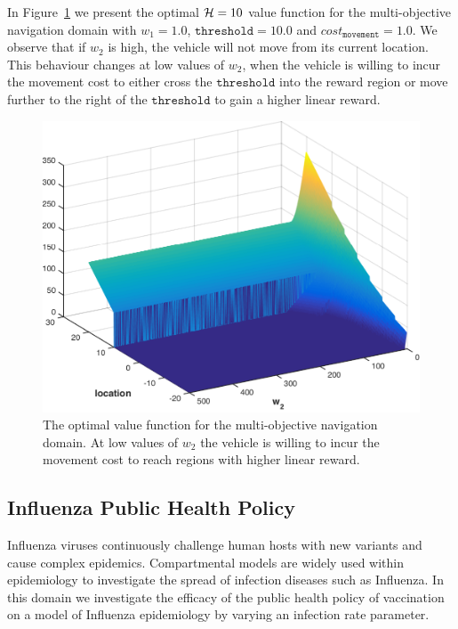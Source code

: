 In Figure~\ref{fig:vehicle1d} we present the optimal {\footnotesize$ \mathcal{H} = 10 $} value function for the multi-objective navigation domain with {\footnotesize $w_1 = 1.0$}, {\footnotesize $ \mathtt{threshold} = 10.0 $} and {\footnotesize$ cost_{\mathtt{movement}} = 1.0 $}. We observe that if {\footnotesize $ w_2 $} is high, the vehicle will not move from its current location. This behaviour changes at low values of {\footnotesize $ w_2 $}, when the vehicle is willing to incur the movement cost to either cross the {\footnotesize $ \mathtt{threshold} $} into the reward region or move further to the right of the {\footnotesize $ \mathtt{threshold} $} to gain a higher linear reward.
\begin{figure}[h!]
    \centering
    \includegraphics[width=0.8\linewidth, height=0.55\linewidth]{images/robot1d}
    \caption{The optimal value function for the multi-objective navigation domain. At low values of {\footnotesize $w_2$} the vehicle is willing to incur the movement cost to reach regions with higher linear reward.}
    \label{fig:vehicle1d}            
\end{figure}

\subsection{Influenza Public Health Policy}
\label{sec:results_influenza}

Influenza viruses continuously challenge human hosts with new variants and cause complex epidemics. Compartmental models are widely used within epidemiology to investigate the spread of infection diseases such as Influenza. In this domain we investigate the efficacy of the public health policy of vaccination on a model of Influenza epidemiology by varying an infection rate parameter.

